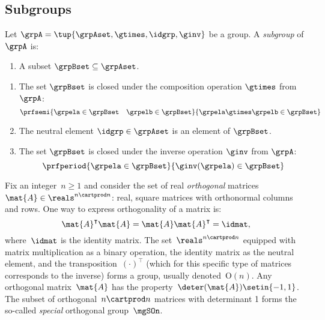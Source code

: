 

\subsection{Subgroups}



\begin{definition}
Let $\grpA = \tup{\grpAset, \gtimes, \idgrp, \ginv}$ be a group. A \emph{subgroup} of $\grpA$ is:

\constit

\begin{enumerate}
\item A subset $\grpBset \subseteq \grpAset$.
\end{enumerate}

\condit

\begin{enumerate}
\item The set $\grpBset$ is closed under the composition operation $\gtimes$ from $\grpA$:
\begin{equation}
\prfsemi{\grpela \in \grpBset \quad \grpelb \in \grpBset}{\grpela \gtimes \grpelb \in \grpBset}
\end{equation}

\item The neutral element $\idgrp \in \grpAset$ is an element of $\grpBset$.

\item The set $\grpBset$ is closed under the inverse operation $\ginv$ from $\grpA$:
\begin{equation}
\prfperiod{\grpela \in \grpBset}{\ginv(\grpela) \in \grpBset}
\end{equation}
\end{enumerate}
\end{definition}



\begin{example}

    Fix an integer~$n\geq 1$ and consider the set of real \emph{orthogonal} matrices~$\mat{A}\in \reals^{n\cartprod n}$:
   real, square matrices with orthonormal columns and rows.
    One way to express orthogonality of a matrix is:
    \begin{equation*}
        \mat{A}^\intercal \mat{A}=\mat{A}\mat{A}^\intercal = \idmat,
    \end{equation*}
    where~$\idmat$ is the identity matrix.
    The set~$\reals^{n\cartprod n}$ equipped with matrix multiplication as a binary operation, the identity matrix as the neutral element, and the transposition~$(\cdot)^\intercal$ (which for this specific type of matrices corresponds to the inverse) forms a group, usually denoted~$\text{O}(n)$.
    Any orthogonal matrix~$\mat{A}$ has the property~$\deter(\mat{A})\setin \{-1,1\}$.
    The subset of orthogonal~$n\cartprod n$ matrices with determinant 1 forms the so-called \emph{special} orthogonal group~$\mgSOn$.
\end{example}

